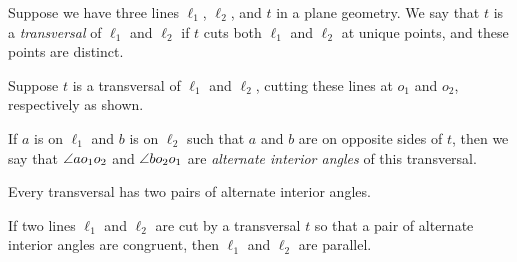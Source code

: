 \begin{dfn}[Transversal]
Suppose we have three lines \(\ell_1\), \(\ell_2\), and \(t\) in a plane geometry.
We say that \(t\) is a \emph{transversal} of \(\ell_1\) and \(\ell_2\) if \(t\) cuts both \(\ell_1\) and \(\ell_2\) at unique points, and these points are distinct.

Suppose \(t\) is a transversal of \(\ell_1\) and \(\ell_2\), cutting these lines at \(o_1\) and \(o_2\), respectively as shown.

\begin{center}
\end{center}

If \(a\) is on \(\ell_1\) and \(b\) is on \(\ell_2\) such that \(a\) and \(b\) are on opposite sides of \(t\), then we say that \(\angle{ao_1o_2}\) and \(\angle{bo_2o_1}\) are \emph{alternate interior angles} of this transversal.
\end{dfn}

Every transversal has two pairs of alternate interior angles.

\begin{prop}\label{prop:aia-theorem}
If two lines \(\ell_1\) and \(\ell_2\) are cut by a transversal \(t\) so that a pair of alternate interior angles are congruent, then \(\ell_1\) and \(\ell_2\) are parallel.
\end{prop}

